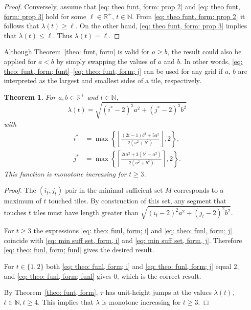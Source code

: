 \documentclass[12pt, a4paper]{article}
\newcommand{\funt}{\tau} %
\newcommand{\funl}{\lambda} %
\newcommand{\len}{\ell} %
\newcommand{\tiles}{t} %
\newcommand{\isoli}{i^\ast}
\newcommand{\jsoli}{j^\ast}
\newcommand{\mss}{M}
\newtheorem{theorem}{Theorem}%
\begin{document}
\begin{proof}
Conversely, assume that \eqref{eq: theo funt, form: prop 2} and \eqref{eq: theo funt, form: prop 3} hold for some $\len \in \mathbb R^+$, $\tiles \in \mathbb N$. From \eqref{eq: theo funt, form: prop 2} it follows that  $\funl(\tiles) \geq \len$. On the other hand, \eqref{eq: theo funt, form: prop 3} implies that $\funl(\tiles) \leq \len$. Thus $\funl(\tiles)=\len$.
\end{proof}

Although Theorem~\ref{theo: funt, form} is valid for $a \geq b$, the result could also be applied for $a < b$ by simply swapping the values of $a$ and $b$. In other words, \eqref{eq: theo: funt, form; funt}--\eqref{eq: theo: funt, form; j}
can be used for any grid if $a$, $b$ are interpreted as the largest and smallest sides of a tile, respectively.

\begin{theorem}
\label{theo: funl, form}
For $a, b \in \mathbb R^+$ and $\tiles \in \mathbb N$,
\begin{equation}
\label{eq: theo: funl, form; funl}
\funl(\tiles) = \sqrt{(\isoli-2)^2 a^2 + (\jsoli-2)^2 b^2}
\end{equation}
with
\begin{align}
\label{eq: theo: funl, form; i}
\isoli &= \max\left\{ \left\lfloor \frac {(2\tiles-1)b^2+5a^2}{2(a^2+b^2)} \right\rfloor, 2 \right\}, \\
\label{eq: theo: funl, form; j}
\jsoli &= \max\left\{ \left\lceil \frac {2\tiles a^2 + 3(b^2-a^2)}{2(a^2+b^2)} \right\rceil, 2 \right\}.
\end{align}
This function is monotone increasing for $\tiles \geq 3$.
\end{theorem}

\begin{proof}
The $(i_\tiles,j_\tiles)$ pair in the minimal sufficient set $\mss$ corresponds to a maximum of $\tiles$ touched tiles. By construction of this set, any segment that touches $\tiles$ tiles must have length greater than $\sqrt{(i_\tiles-2)^2a^2 + (j_\tiles-2)^2b^2}$.

For $\tiles \geq 3$ the expressions \eqref{eq: theo: funl, form; i} and \eqref{eq: theo: funl, form; j} coincide with \eqref{eq: min suff set, form, i} and \eqref{eq: min suff set, form, j}. Therefore \eqref{eq: theo: funl, form; funl} gives the desired result.
	
For $\tiles \in \{1, 2\}$ both \eqref{eq: theo: funl, form; i} and \eqref{eq: theo: funl, form; j} equal $2$, and \eqref{eq: theo: funl, form; funl} gives $0$, which is the correct result.

By Theorem~\ref{theo: funt, form}, $\funt$ has unit-height jumps at the values $\funl(\tiles)$, $\tiles \in \mathbb N, \tiles \geq 4$. This implies that $\funl$ is monotone increasing for $\tiles \geq 3$.
\end{proof}
\end{document}
